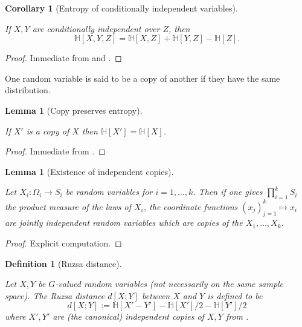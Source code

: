 \documentclass[10pt,a4paper]{article}
\newtheorem{lemma}[theorem]{Lemma}
\newtheorem{corollary}[theorem]{Corollary}
\newtheorem{definition}[theorem]{Definition}
\newcommand{\lean}[1]{}
\newcommand{\uses}[1]{}
\newcommand{\leanok}{}
\newcommand{\bbH}{\mathbb{H}}
\begin{document}
\begin{corollary}[Entropy of conditionally independent variables]\label{cond-trial-ent}
  \lean{ProbabilityTheory.ent_of_cond_indep}\leanok
  If $X, Y$ are conditionally independent over $Z$, then
  $$ \bbH[X,Y,Z] =\bbH[X,Z] + \bbH[Y,Z] - \bbH[Z].$$
\end{corollary}

\begin{proof} \uses{conditional-vanish, conditional-mutual-alt}\leanok Immediate from  and .
\end{proof}


One random variable is said to be a copy of another if they have the same distribution.

\begin{lemma}[Copy preserves entropy]\label{copy-ent}
  \uses{entropy-def}
  \lean{ProbabilityTheory.IdentDistrib.entropy_congr}\leanok
  If $X'$ is a copy of $X$ then $\bbH[X'] = \bbH[X]$.
\end{lemma}

\begin{proof}\leanok Immediate from .
\end{proof}

\begin{lemma}[Existence of independent copies]\label{independent-exist}
  \uses{independent-def}
  \lean{ProbabilityTheory.independent_copies, ProbabilityTheory.independent_copies', ProbabilityTheory.independent_copies_two, ProbabilityTheory.independent_copies3_nondep} \leanok
  Let $X_i : \Omega_i \to S_i$ be random variables for $i=1,\dots,k$.  Then if one gives $\prod_{i=1}^k S_i$ the product measure of the laws of $X_i$, the coordinate functions $(x_j)_{j=1}^k \mapsto x_i$ are jointly independent random variables which are copies of the $X_1,\dots,X_k$.
\end{lemma}

\begin{proof} \leanok
  Explicit computation.
\end{proof}

\begin{definition}[Ruzsa distance]\label{ruz-dist-def}
  \uses{entropy-def, independent-exist}
  \lean{rdist_def}\leanok
  Let $X,Y$ be $G$-valued random variables (not necessarily on the same sample space).  The \emph{Ruzsa distance} $d[X ;Y]$ between $X$ and $Y$ is defined to be
$$ d[X ;Y] := \bbH[X' - Y'] - \bbH[X']/2 - \bbH[Y']/2$$
where $X',Y'$ are (the canonical) independent copies of $X,Y$ from .
\end{definition}
\end{document}
